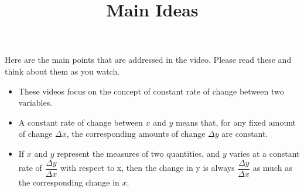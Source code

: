 \documentclass[handout]{ximera}
\title{Main Ideas}
\begin{document}
\begin{abstract}
\end{abstract}


\maketitle

Here are the main points that are addressed in the video. Please read these and think about them as you watch.

\begin{itemize}
\item These videos focus on the concept of constant rate of change between two variables.
\item A constant rate of change between $x$ and $y$ means that, for any fixed amount of change $\Delta x$, the corresponding amounts of change $\Delta y$ are constant.
\item If $x$ and $y$ represent the measures of two quantities, and $y$ varies at a constant rate of $\dfrac{\Delta y}{\Delta x}$ with respect to x, then the change in y is always $\dfrac{\Delta y}{\Delta x}$ as much as the corresponding change in $x$.
\end{itemize}
\end{document}
